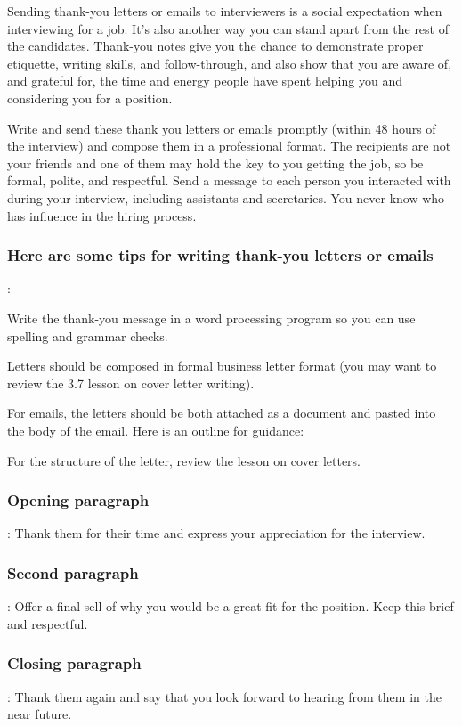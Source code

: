 Sending thank-you letters or emails to interviewers is a social expectation when interviewing for a job. It's also another way you can stand apart from the rest of the candidates. Thank-you notes give you the chance to demonstrate proper etiquette, writing skills, and follow-through, and also show that you are aware of, and grateful for, the time and energy people have spent helping you and considering you for a position.

Write and send these thank you letters or emails promptly (within 48 hours of the interview) and compose them in a professional format. The recipients are not your friends and one of them may hold the key to you getting the job, so be formal, polite, and respectful. Send a message to each person you interacted with during your interview, including assistants and secretaries. You never know who has influence in the hiring process.

\subsubsection*{Here are some tips for writing thank-you letters or emails}:

Write the thank-you message in a word processing program so you can use spelling and grammar checks.

Letters should be composed in formal business letter format (you may want to review the 3.7 lesson on cover letter writing).

For emails, the letters should be both attached as a document and pasted into the body of the email. Here is an outline for guidance:

For the structure of the letter, review the lesson on cover letters.

\subsubsection*{Opening paragraph}: Thank them for their time and express your appreciation for the interview.

\subsubsection*{Second paragraph}: Offer a final sell of why you would be a great fit for the position. Keep this brief and respectful.

\subsubsection*{Closing paragraph}: Thank them again and say that you look forward to hearing from them in the near future.

